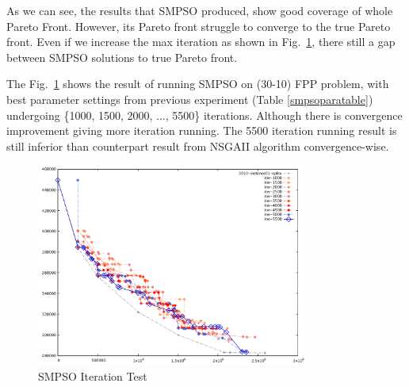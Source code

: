 \documentclass[10pt,journal,compsoc]{IEEEtran}
\newcommand{\Fig}[1]{Fig.~\ref{#1}}
\begin{document}
\begin{table}[ht]
\caption{SMPSO Parameter Selection}
\label{smpsoparatable}
\centering
{}
\end{table}

As we can see, the results that SMPSO produced, show good coverage of whole Pareto Front. However, its Pareto front struggle to converge to the true Pareto front. Even if we increase the max iteration as shown in \Fig{smpsoitertest}, there still a gap between SMPSO solutions to true Pareto front. 

The \Fig{smpsoitertest} shows the result of running SMPSO on (30-10) FPP problem, with best parameter settings from previous experiment (Table \ref{smpsoparatable}) undergoing \{1000, 1500, 2000, ..., 5500\} iterations. Although there is convergence improvement giving more iteration running. The 5500 iteration running result is still inferior than counterpart result from NSGAII algorithm convergence-wise.


\begin{figure}[ht]
\centerline{\includegraphics[page=1,width=3.5in]{SMPSO_iterationtest.pdf}}
\caption{SMPSO Iteration Test} 
\label{smpsoitertest}
\end{figure}
\end{document}
